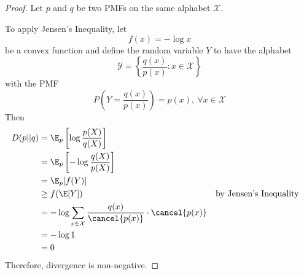 \documentclass[
  coursecode={MTHE 474},
  assignmentname={Homework \homeworknumber},
  studentnumber=20053722,
  name={Bryan Hoang},
  draft,
]{
  ltxanswer%
}
\begin{document}
\begin{questions}
\begin{parts}
      \part{}
      \begin{solution}
        \begin{proof}
          Let \(p\) and \(q\) be two PMFs on the same alphabet \(\mathcal{X}\).

          To apply Jensen's Inequality, let
          \begin{equation*}
            f(x)=-\log x
          \end{equation*}
          be a convex function and define the random variable \(Y\) to have the alphabet
          \begin{equation*}
            \mathcal{Y}=\left\{\frac{q(x)}{p(x)} : x \in \mathcal{X}\right\}
          \end{equation*}
          with the PMF
          \begin{equation*}
            P\left(Y=\frac{q(x)}{p(x)}\right)=p(x),\ \forall x \in \mathcal{X}
          \end{equation*}
          Then
          \begin{align*}
            D(p||q) &= \E_{p}\left[\log\frac{p(X)}{q(X)}\right]                                                                    \\
                    &= \E_{p}\left[-\log\frac{q(X)}{p(X)}\right]                                                                   \\
                    &= \E_{p}[f(Y)]                                                                                                \\
                    &\ge f(\E[Y])                                                                 & &\text{by Jensen's Inequality} \\
                    &= -\log\sum_{x\in\mathcal{X}} \frac{q(x)}{\cancel{p(x)}} \cdot \cancel{p(x)}                                  \\
                    &= -\log 1                                                                                                     \\
                    &= 0
          \end{align*}
          Therefore, divergence is non-negative.
        \end{proof}
      \end{solution}
    \end{parts}
  \end{questions}
\end{document}
